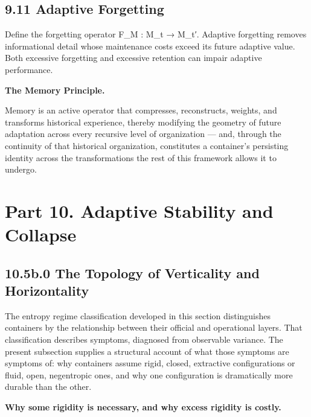 \documentclass[
]{article}
\begin{document}
\hypertarget{adaptive-forgetting}{%
\subsection{9.11 Adaptive Forgetting}\label{adaptive-forgetting}}

Define the forgetting operator F\_M : M\_t → M\_t′. Adaptive forgetting
removes informational detail whose maintenance costs exceed its future
adaptive value. Both excessive forgetting and excessive retention can
impair adaptive performance.

\textbf{The Memory Principle.}

Memory is an active operator that compresses, reconstructs, weights, and
transforms historical experience, thereby modifying the geometry of
future adaptation across every recursive level of organization --- and,
through the continuity of that historical organization, constitutes a
container's persisting identity across the transformations the rest of
this framework allows it to undergo.

\hypertarget{part-10.-adaptive-stability-and-collapse}{%
\section{Part 10. Adaptive Stability and
Collapse}\label{part-10.-adaptive-stability-and-collapse}}

\hypertarget{b.0-the-topology-of-verticality-and-horizontality}{%
\subsection{10.5b.0 The Topology of Verticality and
Horizontality}\label{b.0-the-topology-of-verticality-and-horizontality}}

The entropy regime classification developed in this section
distinguishes containers by the relationship between their official and
operational layers. That classification describes symptoms, diagnosed
from observable variance. The present subsection supplies a structural
account of what those symptoms are symptoms of: why containers assume
rigid, closed, extractive configurations or fluid, open, negentropic
ones, and why one configuration is dramatically more durable than the
other.

\textbf{Why some rigidity is necessary, and why excess rigidity is
costly.}
\end{document}
